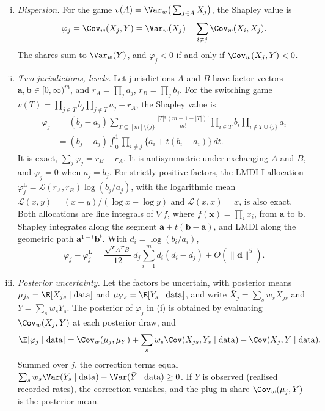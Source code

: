 \begin{theorem}\label{thm:shapley}
\leavevmode
\begin{enumerate}[(i)]
  \item \emph{Dispersion.} For the game $v(A)=\Var_w\big(\sum_{j\in A}X_j\big)$, the Shapley value is
  \[
    \varphi_j=\Cov_w(X_j,Y)=\Var_w(X_j)+\sum_{i\ne j}\Cov_w(X_i,X_j).
  \]
  The shares sum to $\Var_w(Y)$, and $\varphi_j<0$ if and only if $\Cov_w(X_j,Y)<0$.
  \item \emph{Two jurisdictions, levels.} Let jurisdictions $A$ and $B$ have factor vectors $\bm a,\bm b\in[0,\infty)^m$, and $r_A=\prod_ja_j$, $r_B=\prod_jb_j$. For the switching game $v(T)=\prod_{j\in T}b_j\prod_{j\notin T}a_j-r_A$, the Shapley value is
  \begin{equation}\label{eq:funnel-shapley-levels}
  \begin{aligned}
    \varphi_j&=(b_j-a_j)\sum_{T\subseteq[m]\setminus\{j\}}\frac{|T|!\,(m-1-|T|)!}{m!}\prod_{i\in T}b_i\prod_{i\notin T\cup\{j\}}a_i\\
    &=(b_j-a_j)\int_0^1\prod_{i\ne j}\{a_i+t(b_i-a_i)\}\,dt .
  \end{aligned}
  \end{equation}
  It is exact, $\sum_j\varphi_j=r_B-r_A$. It is antisymmetric under exchanging $A$ and $B$, and $\varphi_j=0$ when $a_j=b_j$. For strictly positive factors, the LMDI-I allocation $\varphi_j^{\mathrm L}=\mathcal L(r_A,r_B)\log(b_j/a_j)$, with the logarithmic mean $\mathcal L(x,y)=(x-y)/(\log x-\log y)$ and $\mathcal L(x,x)=x$, is also exact. Both allocations are line integrals of $\nabla f$, where $f(\bm x)=\prod_ix_i$, from $\bm a$ to $\bm b$. Shapley integrates along the segment $\bm a+t(\bm b-\bm a)$, and LMDI along the geometric path $\bm a^{1-t}\bm b^{t}$. With $d_i=\log(b_i/a_i)$,
  \begin{equation}\label{eq:funnel-cubic}
    \varphi_j-\varphi_j^{\mathrm L}=\frac{\sqrt{r_Ar_B}}{12}\,d_j\sum_{i=1}^{m}d_i(d_i-d_j)+O(\|\bm d\|^5).
  \end{equation}
  \item \emph{Posterior uncertainty.} Let the factors be uncertain, with posterior means $\mu_{js}=\E[X_{js}\mid\mathrm{data}]$ and $\mu_{Ys}=\E[Y_s\mid\mathrm{data}]$, and write $\bar X_j=\sum_sw_sX_{js}$ and $\bar Y=\sum_sw_sY_s$. The posterior of $\varphi_j$ in (i) is obtained by evaluating $\Cov_w(X_j,Y)$ at each posterior draw, and
  \begin{equation}\label{eq:funnel-postmean}
    \E[\varphi_j\mid\mathrm{data}]=\Cov_w(\mu_j,\mu_Y)+\sum_sw_s\Cov(X_{js},Y_s\mid\mathrm{data})-\Cov(\bar X_j,\bar Y\mid\mathrm{data}).
  \end{equation}
  Summed over $j$, the correction terms equal $\sum_sw_s\Var(Y_s\mid\mathrm{data})-\Var(\bar Y\mid\mathrm{data})\ge0$. If $Y$ is observed (realised recorded rates), the correction vanishes, and the plug-in share $\Cov_w(\mu_j,Y)$ is the posterior mean.
\end{enumerate}
\end{theorem}

